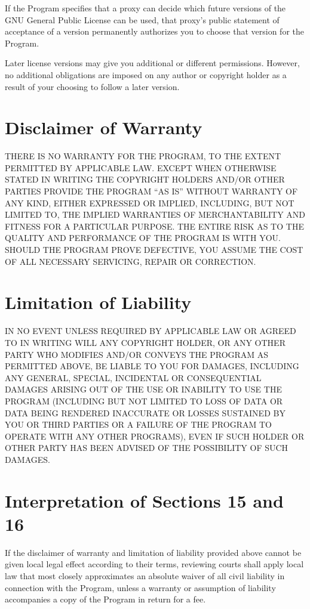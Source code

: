 If the Program specifies that a proxy can decide which future versions of the GNU General Public License can be used, that proxy's public statement of acceptance of a version permanently authorizes you to choose that version for the Program.

Later license versions may give you additional or different permissions. However, no additional obligations are imposed on any author or copyright holder as a result of your choosing to follow a later version.
\section{Disclaimer of Warranty}

THERE IS NO WARRANTY FOR THE PROGRAM, TO THE EXTENT PERMITTED BY APPLICABLE LAW. EXCEPT WHEN OTHERWISE STATED IN WRITING THE COPYRIGHT HOLDERS AND/OR OTHER PARTIES PROVIDE THE PROGRAM “AS IS” WITHOUT WARRANTY OF ANY KIND, EITHER EXPRESSED OR IMPLIED, INCLUDING, BUT NOT LIMITED TO, THE IMPLIED WARRANTIES OF MERCHANTABILITY AND FITNESS FOR A PARTICULAR PURPOSE. THE ENTIRE RISK AS TO THE QUALITY AND PERFORMANCE OF THE PROGRAM IS WITH YOU. SHOULD THE PROGRAM PROVE DEFECTIVE, YOU ASSUME THE COST OF ALL NECESSARY SERVICING, REPAIR OR CORRECTION.
\section{Limitation of Liability}

IN NO EVENT UNLESS REQUIRED BY APPLICABLE LAW OR AGREED TO IN WRITING WILL ANY COPYRIGHT HOLDER, OR ANY OTHER PARTY WHO MODIFIES AND/OR CONVEYS THE PROGRAM AS PERMITTED ABOVE, BE LIABLE TO YOU FOR DAMAGES, INCLUDING ANY GENERAL, SPECIAL, INCIDENTAL OR CONSEQUENTIAL DAMAGES ARISING OUT OF THE USE OR INABILITY TO USE THE PROGRAM (INCLUDING BUT NOT LIMITED TO LOSS OF DATA OR DATA BEING RENDERED INACCURATE OR LOSSES SUSTAINED BY YOU OR THIRD PARTIES OR A FAILURE OF THE PROGRAM TO OPERATE WITH ANY OTHER PROGRAMS), EVEN IF SUCH HOLDER OR OTHER PARTY HAS BEEN ADVISED OF THE POSSIBILITY OF SUCH DAMAGES.
\section{Interpretation of Sections 15 and 16}

If the disclaimer of warranty and limitation of liability provided above cannot be given local legal effect according to their terms, reviewing courts shall apply local law that most closely approximates an absolute waiver of all civil liability in connection with the Program, unless a warranty or assumption of liability accompanies a copy of the Program in return for a fee.

